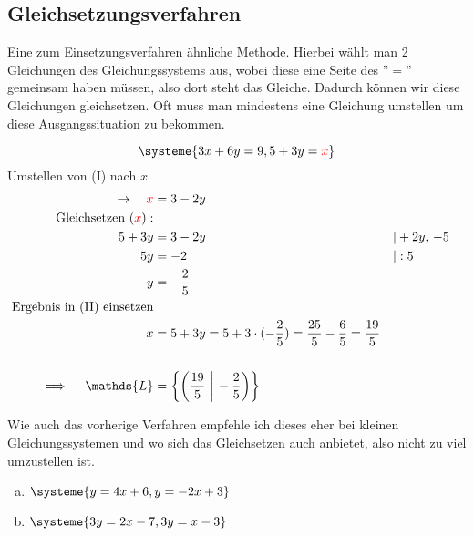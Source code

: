 \documentclass[a4paper,12pt]{article}
\newcommand{\Aufgabe}[2]{
	{
		\vspace*{0.3cm}
		\begin{tcolorbox}[breakable,colback=yellow!0,colframe=black!65!white,title=\textbf{Aufgabe #1:},width=\linewidth ]
			{#2}
		\end{tcolorbox}
		
		
	}
}
\newcommand{\Beispiel}[1]{
	\vspace*{0.2cm}
	\begin{tcolorbox}[breakable,colback=yellow!0,colframe=green!65!black,title=\textbf{Beispiel:},width=\linewidth ]
		{#1}
	\end{tcolorbox}
}
\begin{document}
	\subsection{Gleichsetzungsverfahren}
	Eine zum Einsetzungsverfahren ähnliche Methode. Hierbei wählt man 2 Gleichungen des Gleichungssystems aus, wobei diese eine Seite des ''$=$'' gemeinsam haben müssen, also dort steht das Gleiche. Dadurch können wir diese Gleichungen gleichsetzen. Oft muss man mindestens eine Gleichung umstellen um diese Ausgangssituation zu bekommen.
	\Beispiel{
		\[\systeme{
			3x + 6y = 9,
			5 + 3y = \color{red}x\color{black}
		}\]
		Umstellen von (I) nach $x$
		\begin{align*}
			\rightarrow \quad \color{red}x\color{black}&=3-2y\\
			\text{ Gleichsetzen }(\color{red}x\color{black}):&\\
			5 + 3y &= 3-2y &&| +2y,\, -5\\
			5y &= -2 &&| :5\\
			y&=-\frac{2}{5}\\
			\text{Ergebnis in (II) einsetzen}\\
			x&=5+3y=5+3\cdot (-\frac{2}{5})=\frac{25}{5} - \frac{6}{5}= \frac{19}{5}\\\\
			\implies \quad\mathds{L}&=\left\{\left(\frac{19}{5}\,\,\bigg\vert \, -\frac{2}{5}\right) \right\}
		\end{align*}
	}
	Wie auch das vorherige Verfahren empfehle ich dieses eher bei kleinen Gleichungssystemen und wo sich das Gleichsetzen auch anbietet, also nicht zu viel umzustellen ist. 
	  \Aufgabe{2.3.1: (Finde die Lösungsmenge mittels Gleichsetzungsverfahren)}{
		\begin{multicols}{2}
			\begin{enumerate}[(a)]
				\item $\systeme{y=4x+6,
					y=-2x+3}$
				\item $\systeme{3y=2x-7,
					3y=x-3}$
			\end{enumerate}
		\end{multicols}
	}
\end{document}
